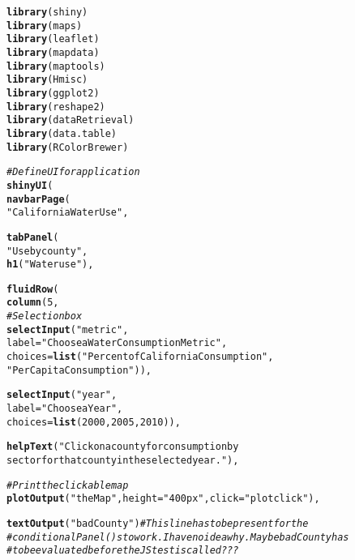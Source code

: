 \documentclass[english]{article}\usepackage[]{graphicx}\usepackage[]{color}
\makeatletter
\newcommand{\hlnum}[1]{\textcolor[rgb]{0.686,0.059,0.569}{#1}}%
\newcommand{\hlstr}[1]{\textcolor[rgb]{0.192,0.494,0.8}{#1}}%
\newcommand{\hlcom}[1]{\textcolor[rgb]{0.678,0.584,0.686}{\textit{#1}}}%
\newcommand{\hlstd}[1]{\textcolor[rgb]{0.345,0.345,0.345}{#1}}%
\newcommand{\hlkwc}[1]{\textcolor[rgb]{0.333,0.667,0.333}{#1}}%
\newcommand{\hlkwd}[1]{\textcolor[rgb]{0.737,0.353,0.396}{\textbf{#1}}}%
\newenvironment{kframe}{%
 \def\at@end@of@kframe{}%
 \ifinner\ifhmode%
  \def\at@end@of@kframe{\end{minipage}}%
  \begin{minipage}{\columnwidth}%
 \fi\fi%
 \def\FrameCommand##1{\hskip\@totalleftmargin \hskip-\fboxsep
 \colorbox{shadecolor}{##1}\hskip-\fboxsep
     \hskip-\linewidth \hskip-\@totalleftmargin \hskip\columnwidth}%
 \MakeFramed {\advance\hsize-\width
   \@totalleftmargin\z@ \linewidth\hsize
   \@setminipage}}%
 {\par\unskip\endMakeFramed%
 \at@end@of@kframe}
\newenvironment{knitrout}{}{} %
\makeatother
\begin{document}
\begin{knitrout}
\color{fgcolor}\begin{kframe}
\begin{alltt}
\hlkwd{library}\hlstd{(shiny)}
\hlkwd{library}\hlstd{(maps)}
\hlkwd{library}\hlstd{(leaflet)}
\hlkwd{library}\hlstd{(mapdata)}
\hlkwd{library}\hlstd{(maptools)}
\hlkwd{library}\hlstd{(Hmisc)}
\hlkwd{library}\hlstd{(ggplot2)}
\hlkwd{library}\hlstd{(reshape2)}
\hlkwd{library}\hlstd{(dataRetrieval)}
\hlkwd{library}\hlstd{(data.table)}
\hlkwd{library}\hlstd{(RColorBrewer)}

\hlcom{# Define UI for application}
\hlkwd{shinyUI}\hlstd{(}
  \hlkwd{navbarPage}\hlstd{(}
    \hlstr{"California Water Use"}\hlstd{,}

    \hlkwd{tabPanel}\hlstd{(}
      \hlstr{"Use by county"}\hlstd{,}
      \hlkwd{h1}\hlstd{(}\hlstr{"Water use"}\hlstd{),}

      \hlkwd{fluidRow}\hlstd{(}
        \hlkwd{column}\hlstd{(}\hlnum{5}\hlstd{,}
               \hlcom{#Selection box}
               \hlkwd{selectInput}\hlstd{(}\hlstr{"metric"}\hlstd{,}
                           \hlkwc{label} \hlstd{=} \hlstr{"Choose a Water Consumption Metric"}\hlstd{,}
                           \hlkwc{choices} \hlstd{=} \hlkwd{list}\hlstd{(}\hlstr{"Percent of California Consumption"}\hlstd{,}
                                          \hlstr{"Per Capita Consumption"}\hlstd{)),}

               \hlkwd{selectInput}\hlstd{(}\hlstr{"year"}\hlstd{,}
                           \hlkwc{label} \hlstd{=} \hlstr{"Choose a Year"}\hlstd{,}
                           \hlkwc{choices} \hlstd{=} \hlkwd{list}\hlstd{(}\hlnum{2000}\hlstd{,}\hlnum{2005}\hlstd{,}\hlnum{2010}\hlstd{)),}

               \hlkwd{helpText}\hlstd{(}\hlstr{"Click on a county for consumption by 
					sector for that county in the selected year."}\hlstd{),}

               \hlcom{# Print the clickable map}
               \hlkwd{plotOutput}\hlstd{(}\hlstr{"theMap"}\hlstd{,} \hlkwc{height} \hlstd{=} \hlstr{"400px"}\hlstd{,} \hlkwc{click} \hlstd{=} \hlstr{"plotclick"}\hlstd{),}

               \hlkwd{textOutput}\hlstd{(}\hlstr{"badCounty"}\hlstd{)}  \hlcom{# This line has to be present for the}
               \hlcom{# conditionalPanel()s to work. I have no idea why. Maybe badCounty has}
               \hlcom{# to be evaluated before the JS test is called???}



\end{alltt}
\end{kframe}
\end{knitrout}
\end{document}
